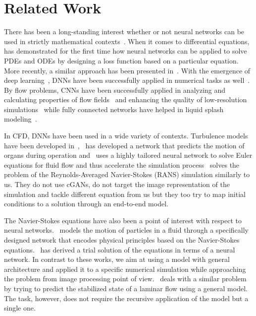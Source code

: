 \documentclass{llncs}
\begin{document}
\section{Related Work}\label{related_work}
There has been a long-standing interest whether or not neural networks can be used in strictly mathematical contexts~\cite{neville2002,lample2019}. When it comes to differential equations,~\cite{lagaris1998} has demonstrated for the first time how neural networks can be applied to solve PDEs and ODEs by designing a loss function based on a particular equation. More recently, a similar approach has been presented in~\cite{avrutskiy2017}. With the emergence of deep learning~\cite{krizhevsky2012}, DNNs have been successfully applied in numerical tasks as well~\cite{wei2017,battaglia2016}. By flow problems, CNNs have been successfully applied in analyzing and calculating properties of flow fields~\cite{georgiou2018} and enhancing the quality of low-resolution simulations~\cite{tempoGan} while fully connected networks have helped in liquid splash modeling~\cite{hu2017}. 

In CFD, DNNs have been used in a wide variety of contexts. Turbulence models have been developed in~\cite{beck2018},~\cite{pfeiffer2019} has developed a network that predicts the motion of organs during operation and~\cite{tompson2016} uses a highly tailored neural network to solve Euler equations for fluid flow and thus accelerate the simulation process~\cite{thuerey2018} solves the problem of the Reynolds-Averaged Navier-Stokes (RANS) simulation similarly to us. They do not use cGANs, do not target the image representation of the simulation and tackle different equation from us but they too try to map initial conditions to a solution through an end-to-end model.

The Navier-Stokes equations have also been a point of interest with respect to neural networks.~\cite{raissi2018} models the motion of particles in a fluid through a specifically designed network that encodes physical principles based on the Navier-Stokes equations.~\cite{baymani2010} has derived a trial solution of the equations in terms of a neural network. In contrast to these works, we aim at using a model with general architecture and applied it to a specific numerical simulation while approaching the problem from image processing point of view.~\cite{guo2016} deals with a similar problem by trying to predict the stabilized state of a laminar flow using a general model. The task, however, does not require the recursive application of the model but a single one.
\end{document}
